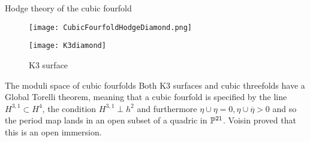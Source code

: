 \documentclass[10pt]{beamer}
\begin{document}
\begin{frame}[fragile]{Hodge theory of the cubic fourfold}
\begin{figure}
    \centering
    \begin{minipage}{0.45\textwidth}
        \centering
        \texttt{[image: CubicFourfoldHodgeDiamond.png]} %
        \caption*{Cubic fourfold}
    \end{minipage}\hfill
    \begin{minipage}{0.45\textwidth}
        \centering
        \texttt{[image: K3diamond]} %
        \caption*{K3 surface}
    \end{minipage}
\end{figure}

\end{frame}

\begin{frame}{The moduli space of cubic fourfolds}
    Both K3 surfaces and cubic threefolds have a Global Torelli theorem, meaning that a cubic fourfold is specified by the line $H^{3,1}\subset H^4$, the condition $H^{3,1}\perp h^2$ and furthermore $\eta\cup \eta =0, \eta \cup \overline{\eta}>0$ and so the period map lands in an open subset of a quadric in $\P^{21}$. Voisin proved that this is an open immersion.
\end{frame}
\end{document}
